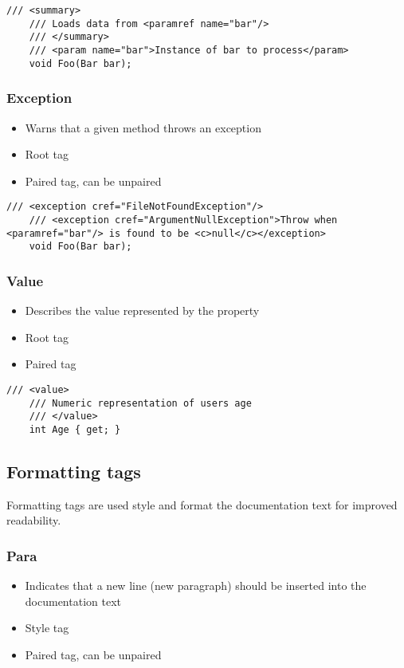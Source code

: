 \begin{lstlisting}[caption=Paramref tag]
    /// <summary>
    /// Loads data from <paramref name="bar"/>
    /// </summary>
    /// <param name="bar">Instance of bar to process</param>
    void Foo(Bar bar);
\end{lstlisting}

\subsubsection*{Exception}
\begin{itemize}
    \item Warns that a given method throws an exception
    \item Root tag
    \item Paired tag, can be unpaired
\end{itemize}

\begin{lstlisting}[caption=Exception tag]
    /// <exception cref="FileNotFoundException"/>
    /// <exception cref="ArgumentNullException">Throw when <paramref="bar"/> is found to be <c>null</c></exception>
    void Foo(Bar bar);
\end{lstlisting}

\subsubsection*{Value}
\begin{itemize}
    \item Describes the value represented by the property
    \item Root tag
    \item Paired tag
\end{itemize}

\begin{lstlisting}[caption=Value tag]
    /// <value>
    /// Numeric representation of users age
    /// </value>
    int Age { get; }
\end{lstlisting}

\subsection{Formatting tags}

Formatting tags are used style and format the documentation text for improved readability.

\subsubsection*{Para}
\begin{itemize}
    \item Indicates that a new line (new paragraph) should be inserted into the documentation text
    \item Style tag
    \item Paired tag, can be unpaired
\end{itemize}

